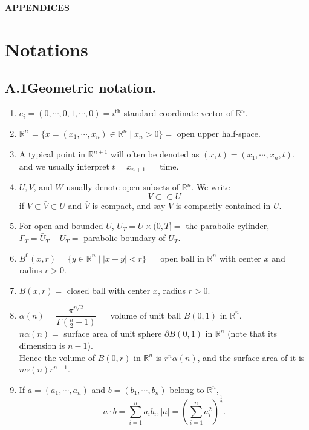 \documentclass[hyperref,UTF8,12pt]{article}
\numberwithin{equation}{subsection}
\theoremstyle{plain}
\theoremstyle{definition}
\numberwithin{theorem}{section}
\numberwithin{lemma}{section}
\numberwithin{proposition}{section}
\numberwithin{remark}{section}
\numberwithin{corollary}{section}
\numberwithin{definition}{section}
\numberwithin{problem}{section}
\numberwithin{example}{section}
\newcommand{\ptl}{\partial}
\newcommand{\mr}{\mathbb{R}}
\begin{document}
\newpage
\begin{appendices}
\begin{center}
\Large{\textbf{APPENDICES}}
\end{center}
	
\section{Notations}
\subsection*{A.1\quad Geometric notation.}\label{app.a.1}
\begin{enumerate}
\item $e_i=(0,\cdots,0,1,\cdots,0)=i^{\text{th}}$ standard coordinate vector of $\mr^n$.
\item $\mr_+^n=\{x=(x_1,\cdots,x_n)\in\mr^n\mid x_n>0\}=$ open upper half-space.
\item A typical point in $\mr^{n+1}$ will often be denoted as $(x,t)=(x_1,\cdots,x_n,t)$, and we usually interpret $t=x_{n+1}=$ time.
\item $U,V$, and $W$ usually denote open subsets of $\mr^n$. We write\[V\subset\subset U\]if $V\subset\bar{V}\subset U$ and $\bar{V}$ is compact, and say $V$ is compactly contained in $U$.
\item For open and bounded $U$, $U_T=U\times(0,T]=$ the parabolic cylinder, $\Gamma_T=\bar{U}_T-U_T=$ parabolic boundary of $U_T$.
\item $B^0(x,r)=\{y\in\mr^n\mid|x-y|<r\}=$ open ball in $\mr^n$ with center $x$ and radius $r>0$.
\item $B(x,r)=$ closed ball with center $x$, radius $r>0$.
\item $\alpha(n)=\dfrac{\pi^{n/2}}{\Gamma\left(\frac{n}{2}+1\right)}=$ volume of unit ball $B(0,1)$ in $\mr^n$.\\[5pt]
$n\alpha(n)=$ surface area of unit sphere $\ptl B(0,1)$ in $\mr^n$ (note that its dimension is $n-1$).\\[3pt]
Hence the volume of $B(0,r)$ in $\mr^n$ is $r^n\alpha(n)$, and the surface area of it is $n\alpha(n)r^{n-1}$.
\item If $a=(a_1,\cdots,a_n)$ and $b=(b_1,\cdots,b_n)$ belong to $\mr^n$,
\[a\cdot b=\sum_{i=1}^na_ib_i,|a|=\left(\sum_{i=1}^na_i^2\right)^{\frac{1}{2}}.\]
\end{enumerate}


\end{appendices}
\end{document}
